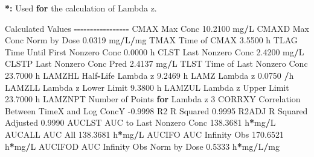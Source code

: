 \documentclass[
  10pt,
]{krantz}
\makeatletter
\newenvironment{Shaded}{\begin{snugshade}}{\end{snugshade}}
\newcommand{\ControlFlowTok}[1]{\textcolor[rgb]{0.13,0.29,0.53}{\textbf{#1}}}
\newcommand{\DecValTok}[1]{\textcolor[rgb]{0.00,0.00,0.81}{#1}}
\newcommand{\ErrorTok}[1]{\textcolor[rgb]{0.64,0.00,0.00}{\textbf{#1}}}
\newcommand{\FloatTok}[1]{\textcolor[rgb]{0.00,0.00,0.81}{#1}}
\newcommand{\NormalTok}[1]{#1}
\newcommand{\OperatorTok}[1]{\textcolor[rgb]{0.81,0.36,0.00}{\textbf{#1}}}
\newcommand{\StringTok}[1]{\textcolor[rgb]{0.31,0.60,0.02}{#1}}
\newenvironment{kframe}{%
\medskip{}
\setlength{\fboxsep}{.8em}
 \def\at@end@of@kframe{}%
 \ifinner\ifhmode%
  \def\at@end@of@kframe{\end{minipage}}%
  \begin{minipage}{\columnwidth}%
 \fi\fi%
 \def\FrameCommand##1{\hskip\@totalleftmargin \hskip-\fboxsep
 \colorbox{shadecolor}{##1}\hskip-\fboxsep
     \hskip-\linewidth \hskip-\@totalleftmargin \hskip\columnwidth}%
 \MakeFramed {\advance\hsize-\width
   \@totalleftmargin\z@ \linewidth\hsize
   \@setminipage}}%
 {\par\unskip\endMakeFramed%
 \at@end@of@kframe}
\renewenvironment{Shaded}{\begin{kframe}}{\end{kframe}}
\makeatother
\begin{document}
\begin{Shaded}
\begin{Highlighting}[]
\OperatorTok{*}\ErrorTok{:}\StringTok{ }\NormalTok{Used }\ControlFlowTok{for}\NormalTok{ the calculation of Lambda z.}


\NormalTok{Calculated Values}
\OperatorTok{{-}{-}{-}{-}{-}{-}{-}{-}{-}{-}{-}{-}{-}{-}{-}{-}{-}}
\NormalTok{CMAX       Max Conc                                       }\FloatTok{10.2100}\NormalTok{ mg}\OperatorTok{/}\NormalTok{L}
\NormalTok{CMAXD      Max Conc Norm by Dose                           }\FloatTok{0.0319}\NormalTok{ mg}\OperatorTok{/}\NormalTok{L}\OperatorTok{/}\NormalTok{mg}
\NormalTok{TMAX       Time of CMAX                                    }\FloatTok{3.5500}\NormalTok{ h}
\NormalTok{TLAG       Time Until First Nonzero Conc                   }\FloatTok{0.0000}\NormalTok{ h}
\NormalTok{CLST       Last Nonzero Conc                               }\FloatTok{2.4200}\NormalTok{ mg}\OperatorTok{/}\NormalTok{L}
\NormalTok{CLSTP      Last Nonzero Conc Pred                          }\FloatTok{2.4137}\NormalTok{ mg}\OperatorTok{/}\NormalTok{L}
\NormalTok{TLST       Time of Last Nonzero Conc                      }\FloatTok{23.7000}\NormalTok{ h}
\NormalTok{LAMZHL     Half}\OperatorTok{{-}}\NormalTok{Life Lambda z                              }\FloatTok{9.2469}\NormalTok{ h}
\NormalTok{LAMZ       Lambda z                                        }\FloatTok{0.0750} \OperatorTok{/}\NormalTok{h}
\NormalTok{LAMZLL     Lambda z Lower Limit                            }\FloatTok{9.3800}\NormalTok{ h}
\NormalTok{LAMZUL     Lambda z Upper Limit                           }\FloatTok{23.7000}\NormalTok{ h}
\NormalTok{LAMZNPT    Number of Points }\ControlFlowTok{for}\NormalTok{ Lambda z                   }\DecValTok{3}
\NormalTok{CORRXY     Correlation Between TimeX and Log ConcY        }\FloatTok{{-}0.9998} 
\NormalTok{R2         R Squared                                       }\FloatTok{0.9995} 
\NormalTok{R2ADJ      R Squared Adjusted                              }\FloatTok{0.9990} 
\NormalTok{AUCLST     AUC to Last Nonzero Conc                      }\FloatTok{138.3681}\NormalTok{ h}\OperatorTok{*}\NormalTok{mg}\OperatorTok{/}\NormalTok{L}
\NormalTok{AUCALL     AUC All                                       }\FloatTok{138.3681}\NormalTok{ h}\OperatorTok{*}\NormalTok{mg}\OperatorTok{/}\NormalTok{L}
\NormalTok{AUCIFO     AUC Infinity Obs                              }\FloatTok{170.6521}\NormalTok{ h}\OperatorTok{*}\NormalTok{mg}\OperatorTok{/}\NormalTok{L}
\NormalTok{AUCIFOD    AUC Infinity Obs Norm by Dose                   }\FloatTok{0.5333}\NormalTok{ h}\OperatorTok{*}\NormalTok{mg}\OperatorTok{/}\NormalTok{L}\OperatorTok{/}\NormalTok{mg}

\end{Highlighting}
\end{Shaded}
\end{document}

